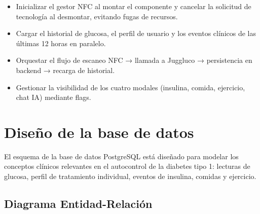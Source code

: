 \begin{itemize}
    \item Inicializar el gestor NFC al montar el componente y cancelar la solicitud
          de tecnología al desmontar, evitando fugas de recursos.
    \item Cargar el historial de glucosa, el perfil de usuario y los eventos clínicos
          de las últimas 12 horas en paralelo.
    \item Orquestar el flujo de escaneo NFC → llamada a Juggluco → persistencia en
          backend → recarga de historial.
    \item Gestionar la visibilidad de los cuatro modales (insulina, comida, ejercicio,
          chat IA) mediante flags.
\end{itemize}

\section{Diseño de la base de datos}
\label{sec:diseno-bd}

El esquema de la base de datos PostgreSQL está diseñado para modelar los conceptos
clínicos relevantes en el autocontrol de la diabetes tipo 1: lecturas de glucosa,
perfil de tratamiento individual, eventos de insulina, comidas y ejercicio.

\subsection{Diagrama Entidad-Relación}
\label{subsec:er-diagram}

